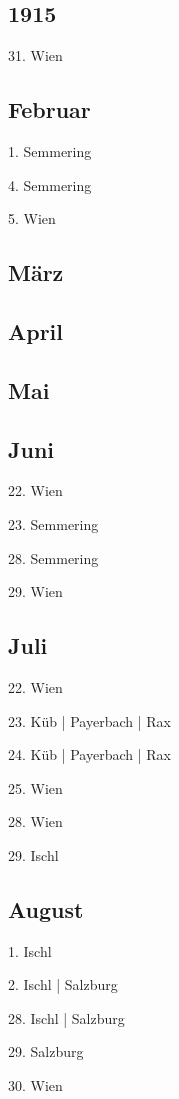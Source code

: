 \documentclass[twoside=false,titlepage=false,open=any, parskip=never, fontsize=10pt, headings=small, chapterprefix=false, appendixprefix=false, DIV=15]{scrbook}
\begin{document}
\begin{multicols}{3}
            \chapter*{1915}
            31. Wien\par
            \section*{Februar}
            1. Semmering\par
            4. Semmering\par
            5. Wien\par
            \section*{März}
            \section*{April}
            \section*{Mai}
            \section*{Juni}
            22. Wien\par
            23. Semmering\par
            28. Semmering\par
            29. Wien\par
            \section*{Juli}
            22. Wien\par
            23. Küb | Payerbach | Rax\par
            24. Küb | Payerbach | Rax\par
            25. Wien\par
            28. Wien\par
            29. Ischl\par
            \section*{August}
            1. Ischl\par
            2. Ischl | Salzburg\par
            28. Ischl | Salzburg\par
            29. Salzburg\par
            30. Wien\par

\end{multicols}
\end{document}
